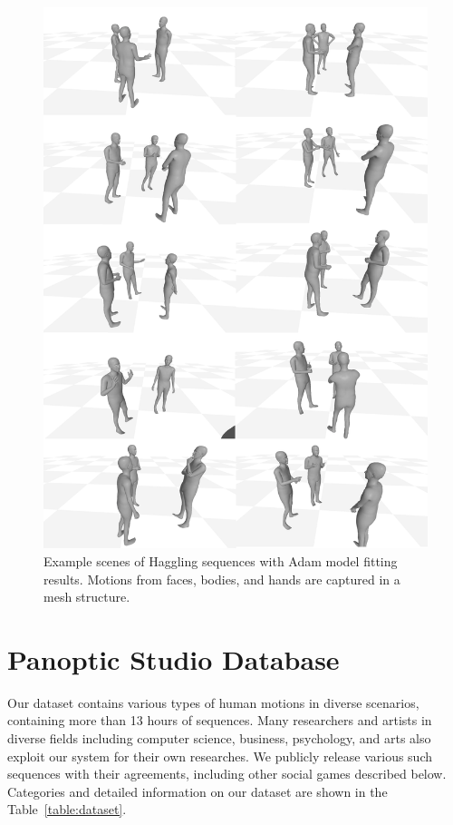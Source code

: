 \begin{figure}
	\centering
	\includegraphics[width=\textwidth]{ssp_fig/haggling_adam}
	\caption{Example scenes of Haggling sequences with Adam model fitting results. Motions from faces, bodies, and hands are captured in a mesh structure.} 
	\label{fig:haggling_measurement_adam}
\end{figure}



\section{Panoptic Studio Database}
Our dataset contains various types of human motions in diverse scenarios, containing more than 13 hours of sequences. Many researchers and artists in diverse fields including computer science, business, psychology, and arts also exploit our system for their own researches. We publicly release various such sequences with their agreements, including other social games described below. Categories and detailed information on our dataset are shown in the Table~\ref{table:dataset}.

